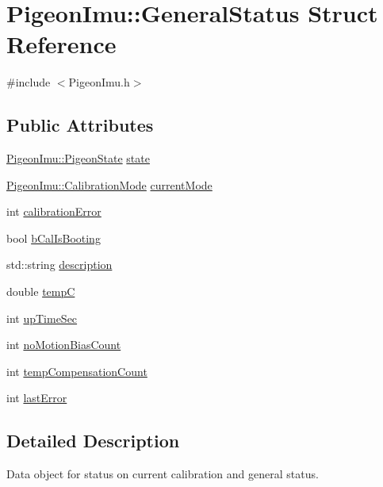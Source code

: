 \hypertarget{struct_pigeon_imu_1_1_general_status}{}\section{Pigeon\+Imu\+:\+:General\+Status Struct Reference}
\label{struct_pigeon_imu_1_1_general_status}


{\ttfamily \#include $<$Pigeon\+Imu.\+h$>$}

\subsection*{Public Attributes}
\begin{DoxyCompactItemize}
\item 
\hyperlink{class_pigeon_imu_af08e19459beb068e840719205fa46c39}{Pigeon\+Imu\+::\+Pigeon\+State} \hyperlink{struct_pigeon_imu_1_1_general_status_aaa6d339448373b22af252bad8cced780}{state}
\item 
\hyperlink{class_pigeon_imu_a1d73ea84ad5c812e809698fab0b9b490}{Pigeon\+Imu\+::\+Calibration\+Mode} \hyperlink{struct_pigeon_imu_1_1_general_status_ac18aec7b326be9680375293dbc26bac8}{current\+Mode}
\item 
int \hyperlink{struct_pigeon_imu_1_1_general_status_a1f603e10aba28f68f1f50d8f6fa17d5c}{calibration\+Error}
\item 
bool \hyperlink{struct_pigeon_imu_1_1_general_status_ae453f6468362fd4162f74619d214ae2e}{b\+Cal\+Is\+Booting}
\item 
std\+::string \hyperlink{struct_pigeon_imu_1_1_general_status_a146df77af7a6c0a7f622009dfd0ce5b7}{description}
\item 
double \hyperlink{struct_pigeon_imu_1_1_general_status_a3b36ff8ad580786993d4d45796091591}{tempC}
\item 
int \hyperlink{struct_pigeon_imu_1_1_general_status_ab0aa810e7a749e93c4e0167015a1c9cc}{up\+Time\+Sec}
\item 
int \hyperlink{struct_pigeon_imu_1_1_general_status_adcd54168a45a133634f2758723a62bcc}{no\+Motion\+Bias\+Count}
\item 
int \hyperlink{struct_pigeon_imu_1_1_general_status_aa415234178c327b5d7ac05b80e651c2b}{temp\+Compensation\+Count}
\item 
int \hyperlink{struct_pigeon_imu_1_1_general_status_aebbffddb320a62582f6960c651a32793}{last\+Error}
\end{DoxyCompactItemize}


\subsection{Detailed Description}
Data object for status on current calibration and general status.


